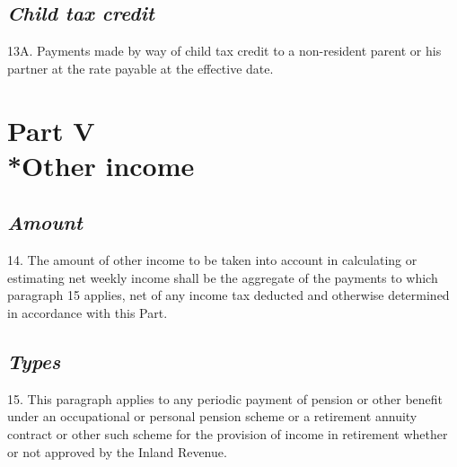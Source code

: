 \documentclass[12pt,a4paper]{article}
\begin{document}
%
%
%

\subsection*{\itshape Child tax credit}

13A.  Payments made by way of child tax credit to a non-resident parent or his partner at the rate payable at the effective date.


\section[Part V --- Other income]{Part V\\*Other income}

\renewcommand\parthead{--- Part V}

\subsection*{\itshape Amount}

14.  The amount of other income to be taken into account in calculating or estimating net weekly income shall be the aggregate of the payments to which paragraph 15 applies, net of any income tax deducted and otherwise determined in accordance with this Part.

\subsection*{\itshape Types}

15.  This paragraph applies to any periodic payment of pension or other benefit under an occupational or personal pension scheme or a retirement annuity contract or other such scheme for the provision of income in retirement whether or not approved by the Inland Revenue.
\end{document}
